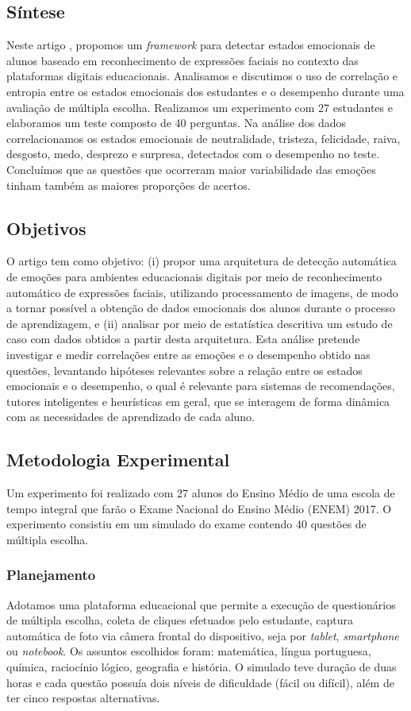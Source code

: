 \subsection{Síntese}
Neste artigo \citep{cruz2017framework}, propomos um \textit{framework} para detectar estados emocionais de alunos baseado em reconhecimento de expressões faciais no contexto das plataformas digitais educacionais. Analisamos e discutimos o uso de correlação e entropia entre os estados emocionais dos estudantes e o desempenho durante uma avaliação de múltipla escolha. Realizamos um experimento com 27 estudantes e elaboramos um teste composto de 40 perguntas. Na análise dos dados correlacionamos os estados emocionais de neutralidade, tristeza, felicidade, raiva, desgosto, medo, desprezo e surpresa, detectados com o desempenho no teste. Concluímos que as questões que ocorreram maior variabilidade das emoções tinham também as maiores proporções de acertos.

\subsection{Objetivos}
O artigo \citep{cruz2017framework} tem como objetivo: (i) propor uma arquitetura de detecção automática de emoções para ambientes educacionais digitais por meio de reconhecimento automático de expressões faciais, utilizando processamento de imagens, de modo a tornar possível a obtenção de dados emocionais dos alunos durante o processo de aprendizagem, e (ii) analisar por meio de estatística descritiva um estudo de caso com dados obtidos a partir desta arquitetura. Esta análise pretende investigar e medir correlações entre as emoções e o desempenho obtido nas questões, levantando hipóteses relevantes sobre a relação entre os estados emocionais e o desempenho, o qual é relevante para sistemas de recomendações, tutores inteligentes e heurísticas em geral, que se interagem de forma dinâmica com as necessidades de aprendizado de cada aluno.

\subsection{Metodologia Experimental}
Um experimento foi realizado com 27 alunos do Ensino Médio de uma escola de tempo integral que farão o Exame Nacional do Ensino Médio (ENEM) 2017. O experimento consistiu em um simulado do exame contendo 40 questões de múltipla escolha.

\subsubsection{Planejamento}\label{sec:plan}
Adotamos uma plataforma educacional que permite a execução de questionários de múltipla escolha, coleta de cliques efetuados pelo estudante, captura automática de foto via câmera frontal do dispositivo, seja por \textit{tablet}, \textit{smartphone} ou \textit{notebook}. Os assuntos escolhidos foram: matemática, língua portuguesa, química, raciocínio lógico, geografia e história. O simulado teve duração de duas horas e cada questão possuía dois níveis de dificuldade (fácil ou difícil), além de ter cinco respostas alternativas.

